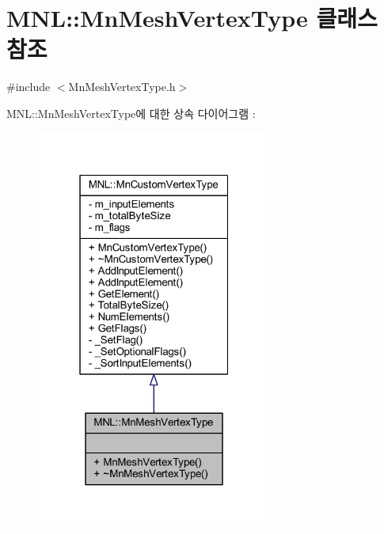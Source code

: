 \hypertarget{class_m_n_l_1_1_mn_mesh_vertex_type}{}\section{M\+NL\+:\+:Mn\+Mesh\+Vertex\+Type 클래스 참조}
\label{class_m_n_l_1_1_mn_mesh_vertex_type}


{\ttfamily \#include $<$Mn\+Mesh\+Vertex\+Type.\+h$>$}



M\+NL\+:\+:Mn\+Mesh\+Vertex\+Type에 대한 상속 다이어그램 \+: \nopagebreak
\begin{figure}[H]
\begin{center}
\leavevmode
\includegraphics[width=220pt]{class_m_n_l_1_1_mn_mesh_vertex_type__inherit__graph}
\end{center}
\end{figure}



